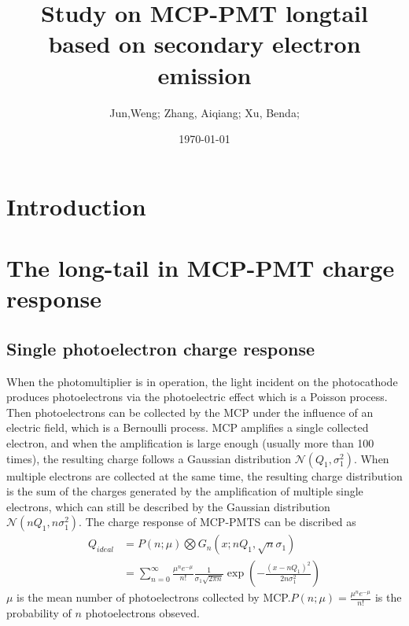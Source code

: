 \documentclass{article}
\title{Study on MCP-PMT longtail based on secondary electron emission}
\author{Jun,Weng; Zhang, Aiqiang; Xu, Benda;} %
\date{\today}
\begin{document}
\maketitle
\section{Introduction}\label{sec:Introduction}
\section{The long-tail in MCP-PMT charge response }\label{sec:long-tail}
\subsection{Single photoelectron charge response}\label{subsec:statistical}
When the photomultiplier is in operation, the light incident on the photocathode produces photoelectrons via the photoelectric effect
which is a Poisson process. Then photoelectrons can be collected by the MCP under the influence of an electric field, which is a Bernoulli process.
MCP amplifies a single collected  electron, and when the amplification is large enough (usually more than 100 times),
the resulting charge follows a Gaussian distribution $\mathcal{N} (Q_1, \sigma_1^2)$. When multiple electrons are collected at the same time, the resulting charge
distribution is the sum of the charges generated by the amplification of multiple single electrons,
which can still be described by the Gaussian distribution $\mathcal{N} (nQ_1, n\sigma_1^2)$.
The charge response of MCP-PMTS can be discribed as ~\cite{1994Absolute}
\begin{equation}
    \begin{aligned}
        Q_{ideal} & = P(n;\mu)\bigotimes G_n(x;nQ_1,\sqrt{n}\sigma_1)                                                                      \\
                  & =\sum_{n = 0}^{\infty}\frac{\mu^n e^{-\mu}}{n!}\frac{1}{\sigma_1\sqrt{2\pi n}}\exp(-\frac{{(x-nQ_1)}^2}{2n\sigma_1^2})
    \end{aligned}
    \label{eq:sreal}
\end{equation}
$\mu$ is the mean number of photoelectrons collected by MCP.\@ $P(n;\mu) = \frac{\mu^n e^{-\mu}}{n!}$ is the probability of $n$ photoelectrons obseved.
\end{document}
